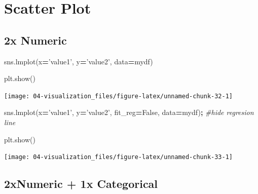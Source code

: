 \documentclass[
]{book}
\newenvironment{Shaded}{\begin{snugshade}}{\end{snugshade}}
\newcommand{\CommentTok}[1]{\textcolor[rgb]{0.37,0.37,0.37}{\textit{#1}}}
\newcommand{\NormalTok}[1]{#1}
\newcommand{\OperatorTok}[1]{\textcolor[rgb]{0.43,0.43,0.43}{\textbf{#1}}}
\newcommand{\StringTok}[1]{\textcolor[rgb]{0.5,0.5,0.5}{#1}}
\newcommand{\VariableTok}[1]{\textcolor[rgb]{0,0,0}{#1}}
\begin{document}
\hypertarget{scatter-plot-1}{%
\section{Scatter Plot}\label{scatter-plot-1}}

\hypertarget{x-numeric}{%
\subsection{2x Numeric}\label{x-numeric}}

\begin{Shaded}
\begin{Highlighting}[]
\NormalTok{sns.lmplot(x}\OperatorTok{=}\StringTok{'value1'}\NormalTok{, y}\OperatorTok{=}\StringTok{'value2'}\NormalTok{, data}\OperatorTok{=}\NormalTok{mydf)}
\end{Highlighting}
\end{Shaded}

\begin{Shaded}
\begin{Highlighting}[]
\NormalTok{plt.show()}
\end{Highlighting}
\end{Shaded}

\texttt{[image: 04-visualization\_files/figure-latex/unnamed-chunk-32-1]}

\begin{Shaded}
\begin{Highlighting}[]
\NormalTok{sns.lmplot(x}\OperatorTok{=}\StringTok{'value1'}\NormalTok{, y}\OperatorTok{=}\StringTok{'value2'}\NormalTok{, fit_reg}\OperatorTok{=}\VariableTok{False}\NormalTok{, data}\OperatorTok{=}\NormalTok{mydf)}\OperatorTok{;}  \CommentTok{#hide regresion line}
\end{Highlighting}
\end{Shaded}

\begin{Shaded}
\begin{Highlighting}[]
\NormalTok{plt.show()}
\end{Highlighting}
\end{Shaded}

\texttt{[image: 04-visualization\_files/figure-latex/unnamed-chunk-33-1]}

\hypertarget{xnumeric-1x-categorical}{%
\subsection{2xNumeric + 1x Categorical}\label{xnumeric-1x-categorical}}
\end{document}
